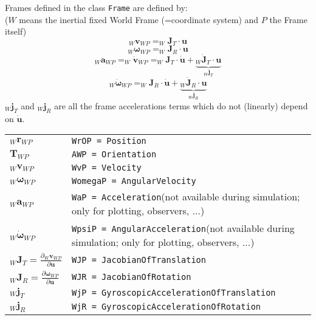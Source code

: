 \documentclass{report}
\newcommand{\bs}[1]{\boldsymbol #1}
\begin{document}
\vspace{3em}
Frames defined in the class \texttt{Frame} are defined by:\\
($W$ means the inertial fixed World Frame (=coordinate system) and $P$ the Frame itself)
\begin{equation}
  _W\bs{v}_{WP}=_W\bs{J}_T \cdot \bs{u}
\end{equation}
\begin{equation}
  _W\bs{\omega}_{WP}=_W\bs{J}_R \cdot \bs{u}
\end{equation}
\begin{equation}
  _W\bs{a}_{WP}=_W\dot{\bs{v}}_{WP}=_W\bs{J}_T \cdot \dot{\bs{u}} + \underbrace{_W\dot{\bs{J}}_T \cdot \bs{u}}_{_W\bs{j}_T}
\end{equation}
\begin{equation}
  _W\dot{\bs{\omega}}_{WP}=_W\bs{J}_R \cdot \dot{\bs{u}} + \underbrace{_W\dot{\bs{J}}_R \cdot \bs{u}}_{_W\bs{j}_R}
\end{equation}
$_W\bs{j}_T$ and $_W\bs{j}_R$ are all the frame accelerations terms which do not (linearly) depend on $\dot{\bs{u}}$.

\begin{tabular}{|l|p{10cm}|}
  \hline
  $_W\bs{r}_{WP}$ & \texttt{WrOP = Position} \\
  $\bs{T}_{WP}$ & \texttt{AWP = Orientation} \\
  $_W\bs{v}_{WP}$ & \texttt{WvP = Velocity} \\
  $_W\bs{\omega}_{WP}$ & \texttt{WomegaP = AngularVelocity} \\
  $_W\bs{a}_{WP}$ & \texttt{WaP = Acceleration}\newline(not available during simulation; only for plotting, observers, ...) \\
  $_W\dot{\bs{\omega}}_{WP}$ & \texttt{WpsiP = AngularAcceleration}\newline(not available during simulation; only for plotting, observers, ...) \\
  $_W\bs{J}_T=\frac{\partial_W\bs{v}_{WP}}{\partial\bs{u}}$ & \texttt{WJP = JacobianOfTranslation} \\
  $_W\bs{J}_R=\frac{\partial\bs{\omega}_{WP}}{\partial\bs{u}}$ & \texttt{WJR = JacobianOfRotation} \\
  $_W\bs{j}_T$ & \texttt{WjP = GyroscopicAccelerationOfTranslation} \\
  $_W\bs{j}_R$ & \texttt{WjR = GyroscopicAccelerationOfRotation} \\
  \hline
\end{tabular}
\end{document}
